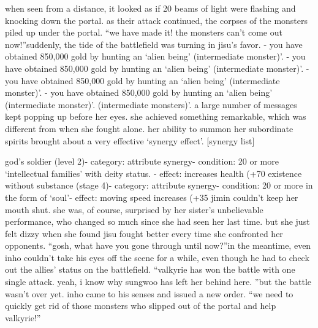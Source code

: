  when seen from a distance, it looked as if 20 beams of light were flashing and knocking down the portal.
as their attack continued, the corpses of the monsters piled up under the portal.
“we have made it! the monsters can’t come out now!”suddenly, the tide of the battlefield was turning in jisu’s favor.
- you have obtained 850,000 gold by hunting an ‘alien being’ (intermediate monster)’.
- you have obtained 850,000 gold by hunting an ‘alien being’ (intermediate monster)’.
- you have obtained 850,000 gold by hunting an ‘alien being’ (intermediate monster)’.
- you have obtained 850,000 gold by hunting an ‘alien being’ (intermediate monster)’.
(intermediate monsters)’.
a large number of messages kept popping up before her eyes.
 she achieved something remarkable, which was different from when she fought alone.
her ability to summon her subordinate spirits brought about a very effective ‘synergy effect’.
[synergy list]

god’s soldier (level 2)- category: attribute synergy- condition: 20 or more ‘intellectual families’ with deity status.
- effect: increases health (+70%
existence without substance (stage 4)- category: attribute synergy- condition: 20 or more in the form of ‘soul’- effect: moving speed increases (+35%
jimin couldn’t keep her mouth shut.
 she was, of course, surprised by her sister’s unbelievable performance, who changed so much since she had seen her last time.
 but she just felt dizzy when she found jisu fought better every time she confronted her opponents.
“gosh, what have you gone through until now?”in the meantime, even inho couldn’t take his eyes off the scene for a while, even though he had to check out the allies’ status on the battlefield.
“valkyrie has won the battle with one single attack.
 yeah, i know why sungwoo has left her behind here.
”but the battle wasn’t over yet.
inho came to his senses and issued a new order.
“we need to quickly get rid of those monsters who slipped out of the portal and help valkyrie!”

 